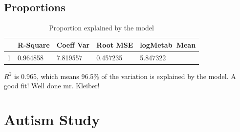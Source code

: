 \documentclass[english]{article}\usepackage[]{graphicx}\usepackage[]{color}
\begin{document}
\subsection{Proportions}
\begin{table}[H]
\centering
\caption{Proportion explained by the model} 
\label{tab:prop}
\begin{tabular}{rllll}
  \toprule
 & R-Square & Coeff Var & Root MSE & logMetab Mean \\ 
  \midrule
1 & 0.964858 & 7.819557 & 0.457235 & 5.847322 \\ 
   \bottomrule
\end{tabular}
\end{table}

$R^2$ is 0.965, which means 96.5\% of the variation is explained by the model. A good fit! Well done mr. Kleiber!
\section{Autism Study}
\end{document}
